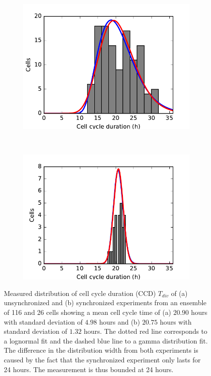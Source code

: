 \documentclass[pdftex,12pt,a4paper]{report}
\begin{document}
\begin{figure}[H]
\centering
\begin{subfigure}{.48\textwidth}
  \centering
  \includegraphics[width=\textwidth]{images/unsyn_cell_cycle_length_control.pdf}
  \caption{}
  \label{fig:ccd_unsyn}
\end{subfigure}
~
\begin{subfigure}{.48\textwidth}
  \centering
  \includegraphics[width=\textwidth]{images/syn_cell_cycle_length_control.pdf}
  \caption{}
  \label{fig:ccd_syn}
\end{subfigure}
\caption[Measured distribution of CCD in the synchronized and unsynchronized experiments]{Measured distribution of cell cycle duration (CCD) $T_{div}$ of (a) unsynchronized and (b) synchronized experiments from an ensemble of 116 and 26 cells showing a mean cell cycle time of (a) $20.90$ hours with standard deviation of $4.98$ hours and (b) $20.75$ hours with standard deviation of $1.32$ hours. The dotted red line corresponds to a lognormal fit and the dashed blue line to a gamma distribution fit. The difference in the distribution width from both experiments is caused by the fact that the synchronized experiment only lasts for 24 hours. The measurement is thus bounded at 24 hours.}
\label{fig:ccd_all}
\end{figure}
\end{document}
